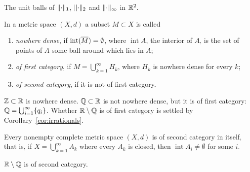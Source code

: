 \begin{nfigure}{The unit balls of $\lVert\cdot\rVert_1$, $\lVert\cdot\rVert_2$ and
$\lVert\cdot\rVert_\infty$ in $\mathbb{R}^2$.}
\end{nfigure}

\begin{definition}[Category]\label{def:category}
In a metric space $(X,d)$ a subset $M \subset X$ is called
\begin{enumerate}
  \item \emph{nowhere dense}, if $\operatorname{int}(\overline{M}) = \emptyset$,
    where $\operatorname{int} A$, the interior of $A$, is the set of points
    of $A$ some ball around which lies in $A$;
  \item \emph{of first category}, if $M = \bigcup_{k=1}^{\infty} H_k$, where
    $H_k$ is nowhere dense for every $k$;
  \item \emph{of second category}, if it is not of first category.
\end{enumerate}
\end{definition}

\begin{example}
$\mathbb{Z} \subset \mathbb{R}$ is nowhere dense. $\mathbb{Q} \subset \mathbb{R}$ is not nowhere dense, but it
is of first category: $\mathbb{Q} = \bigcup_{i=1}^{\infty} \{q_i\}$. Whether
$\mathbb{R} \setminus \mathbb{Q}$ is of first category is settled by
Corollary~\ref{cor:irrationals}.
\end{example}

\begin{theorem}\label{thm:baire}
Every nonempty complete metric space $(X,d)$ is of second category in itself,
that is, if $X = \bigcup_{k=1}^{\infty} A_k$ where every $A_k$ is closed,
then $\operatorname{int} A_i \ne \emptyset$ for some $i$.
\end{theorem}

\begin{corollary}\label{cor:irrationals}
$\mathbb{R} \setminus \mathbb{Q}$ is of second category.
\end{corollary}

